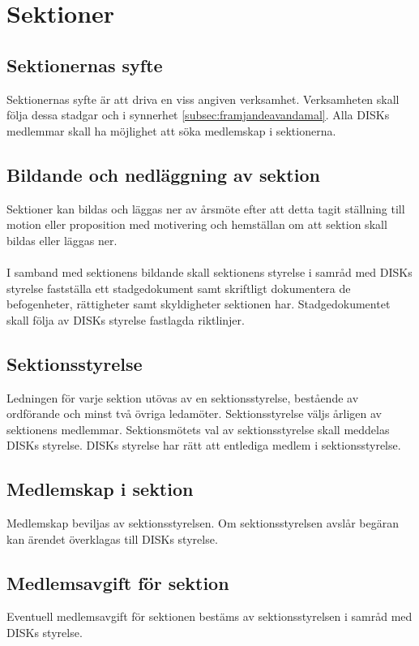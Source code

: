 \clearpage
\section{Sektioner}
\label{sec:sektioner}

	\subsection{Sektionernas syfte}
	\label{subsec:sektionernassyfte}
		Sektionernas syfte är att driva en viss angiven verksamhet. Verksamheten skall följa dessa stadgar och i synnerhet \ref{subsec:framjandeavandamal}. Alla DISKs medlemmar skall ha möjlighet att söka medlemskap i sektionerna.

	\subsection{Bildande och nedläggning av sektion}
	\label{subsec:bildandeochnedlaggningavsektion}
		Sektioner kan bildas och läggas ner av årsmöte efter att detta tagit ställning till motion eller proposition med motivering och hemställan om att sektion skall bildas eller läggas ner.\\ \\
		I samband med sektionens bildande skall sektionens styrelse i samråd med DISKs styrelse fastställa ett stadgedokument samt skriftligt dokumentera de befogenheter, rättigheter samt skyldigheter sektionen har. Stadgedokumentet skall följa av DISKs styrelse fastlagda riktlinjer. 

	\subsection{Sektionsstyrelse}
	\label{subsec:sektionsstyrelse}
		Ledningen för varje sektion utövas av en sektionsstyrelse, bestående av ordförande och minst två övriga ledamöter. Sektionsstyrelse väljs årligen av sektionens medlemmar. Sektionsmötets val av sektionsstyrelse skall meddelas DISKs styrelse. DISKs styrelse har rätt att entlediga medlem i sektionsstyrelse.

	\subsection{Medlemskap i sektion}
	\label{subsec:medlemskapisektion}
		Medlemskap beviljas av sektionsstyrelsen. Om sektionsstyrelsen avslår begäran kan ärendet överklagas till DISKs styrelse.

	\subsection{Medlemsavgift för sektion}
	\label{subsec:medlemsavgiftforsektion}
		Eventuell medlemsavgift för sektionen bestäms av sektionsstyrelsen i samråd med DISKs styrelse.

